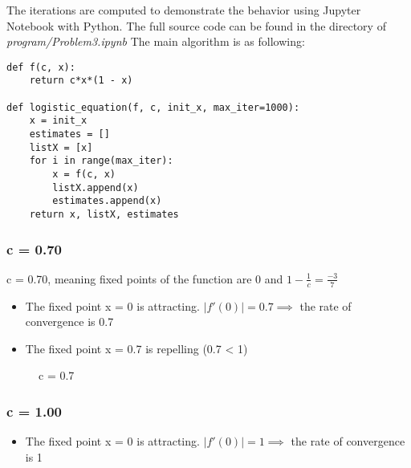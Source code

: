 The iterations are computed to demonstrate the behavior using Jupyter Notebook with Python. The full source code can be found in the directory of \textit{program/Problem3.ipynb}
The main algorithm is as following:
\begin{lstlisting}
def f(c, x):
    return c*x*(1 - x)

def logistic_equation(f, c, init_x, max_iter=1000):
    x = init_x
    estimates = []
    listX = [x]
    for i in range(max_iter):
        x = f(c, x)
        listX.append(x)
        estimates.append(x)
    return x, listX, estimates
\end{lstlisting}

\subsubsection{c = 0.70}
c = 0.70, meaning fixed points of the function are 0 and $1 - \frac{1}{c} = \frac{-3}{7}$

\begin{itemize}
    \item The fixed point x = 0 is attracting. $|f'(0)| = 0.7 \implies$ the rate of convergence is 0.7
    \item The fixed point x = 0.7 is repelling (0.7 < 1)
\end{itemize}

\begin{figure}[H]
\centering
{}
\caption{c = 0.7}
\end{figure}

\subsubsection{c = 1.00}
\begin{itemize}
    \item The fixed point x = 0 is attracting. $|f'(0)| = 1 \implies$ the rate of convergence is 1
\end{itemize}

